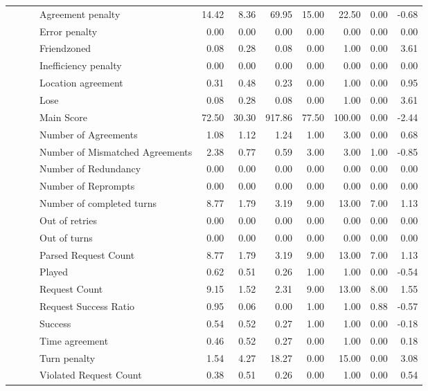 \begin{tabular}{llllrrrrrrr}
 &  &  & Agreement penalty & 14.42 & 8.36 & 69.95 & 15.00 & 22.50 & 0.00 & -0.68 \\
 &  &  & Error penalty & 0.00 & 0.00 & 0.00 & 0.00 & 0.00 & 0.00 & 0.00 \\
 &  &  & Friendzoned & 0.08 & 0.28 & 0.08 & 0.00 & 1.00 & 0.00 & 3.61 \\
 &  &  & Inefficiency penalty & 0.00 & 0.00 & 0.00 & 0.00 & 0.00 & 0.00 & 0.00 \\
 &  &  & Location agreement & 0.31 & 0.48 & 0.23 & 0.00 & 1.00 & 0.00 & 0.95 \\
 &  &  & Lose & 0.08 & 0.28 & 0.08 & 0.00 & 1.00 & 0.00 & 3.61 \\
 &  &  & Main Score & 72.50 & 30.30 & 917.86 & 77.50 & 100.00 & 0.00 & -2.44 \\
 &  &  & Number of Agreements & 1.08 & 1.12 & 1.24 & 1.00 & 3.00 & 0.00 & 0.68 \\
 &  &  & Number of Mismatched Agreements & 2.38 & 0.77 & 0.59 & 3.00 & 3.00 & 1.00 & -0.85 \\
 &  &  & Number of Redundancy & 0.00 & 0.00 & 0.00 & 0.00 & 0.00 & 0.00 & 0.00 \\
 &  &  & Number of Reprompts & 0.00 & 0.00 & 0.00 & 0.00 & 0.00 & 0.00 & 0.00 \\
 &  &  & Number of completed turns & 8.77 & 1.79 & 3.19 & 9.00 & 13.00 & 7.00 & 1.13 \\
 &  &  & Out of retries & 0.00 & 0.00 & 0.00 & 0.00 & 0.00 & 0.00 & 0.00 \\
 &  &  & Out of turns & 0.00 & 0.00 & 0.00 & 0.00 & 0.00 & 0.00 & 0.00 \\
 &  &  & Parsed Request Count & 8.77 & 1.79 & 3.19 & 9.00 & 13.00 & 7.00 & 1.13 \\
 &  &  & Played & 0.62 & 0.51 & 0.26 & 1.00 & 1.00 & 0.00 & -0.54 \\
 &  &  & Request Count & 9.15 & 1.52 & 2.31 & 9.00 & 13.00 & 8.00 & 1.55 \\
 &  &  & Request Success Ratio & 0.95 & 0.06 & 0.00 & 1.00 & 1.00 & 0.88 & -0.57 \\
 &  &  & Success & 0.54 & 0.52 & 0.27 & 1.00 & 1.00 & 0.00 & -0.18 \\
 &  &  & Time agreement & 0.46 & 0.52 & 0.27 & 0.00 & 1.00 & 0.00 & 0.18 \\
 &  &  & Turn penalty & 1.54 & 4.27 & 18.27 & 0.00 & 15.00 & 0.00 & 3.08 \\
 &  &  & Violated Request Count & 0.38 & 0.51 & 0.26 & 0.00 & 1.00 & 0.00 & 0.54 \\

\end{tabular}
